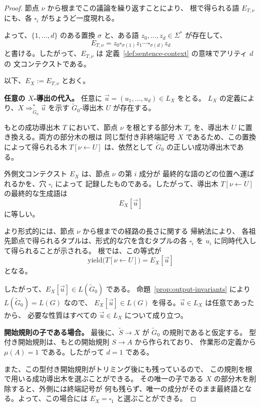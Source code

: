 \documentclass[11pt,a4paper]{ltjsarticle}
\theoremstyle{remark}
\newcommand{\tuple}[1]{\vec{#1}}
\newcommand{\blank}{\square}
\newcommand{\yield}{\mathrm{yield}}
\begin{document}
\begin{proof}
節点 \(\nu\) から根までこの議論を繰り返すことにより、
根で得られる語 \(E_{T,\nu}\) にも、各
\(\blank_i\) がちょうど一度現れる。

よって、\(\{1,\ldots,d\}\) のある置換 \(\sigma\) と、ある語
\(z_0,\ldots,z_d\in\Sigma^*\) が存在して、
\[
  E_{T,\nu}
  =
  z_0\blank_{\sigma(1)}z_1
  \cdots
  \blank_{\sigma(d)}z_d
\]
と書ける。したがって、\(E_{T,\nu}\) は
定義~\ref{def:sentence-context} の意味でアリティ \(d\) の
文コンテクストである。

以下、\(E_X:=E_{T,\nu}\) とおく。

\medskip
\noindent
\textbf{任意の \(X\)-導出の代入。}
任意に \(\tuple u=(u_1,\ldots,u_d)\in L_X\) をとる。
\(L_X\) の定義により、\(X\Rightarrow_{\widetilde G_0}^*\tuple u\) を示す
\(\widetilde G_0\)-導出木 \(U\) が存在する。

もとの成功導出木 \(T\) において、節点 \(\nu\) を根とする部分木
\(T_\nu\) を、導出木 \(U\) に置き換える。両方の部分木の根は
同じ型付き非終端記号 \(X\) であるため、この置換によって得られる木
\(T[\nu\leftarrow U]\) は、依然として \(\widetilde G_0\) の正しい成功導出木である。

外側文コンテクスト \(E_X\) は、節点 \(\nu\) の第 \(i\) 成分が
最終的な語のどの位置へ運ばれるかを、穴 \(\blank_i\) によって
記録したものである。したがって、導出木
\(T[\nu\leftarrow U]\) の最終的な生成語は
\[
  E_X[\tuple u]
\]
に等しい。

より形式的には、節点 \(\nu\) から根までの経路の長さに関する
帰納法により、
各祖先節点で得られるタプルは、形式的な穴を含むタプルの各
\(\blank_i\) を \(u_i\) に同時代入して得られることが示される。
根では、この等式が
\[
  \yield\bigl(T[\nu\leftarrow U]\bigr)
  =
  E_X[\tuple u]
\]
となる。

したがって、\(E_X[\tuple u]\in L(\widetilde G_0)\) である。
命題~\ref{prop:output-invariants} により \(L(\widetilde G_0)=L(G)\) なので、
\(E_X[\tuple u]\in L(G)\) を得る。\(\tuple u\in L_X\) は任意であったから、
必要な性質はすべての \(\tuple u\in L_X\) について成り立つ。

\medskip
\noindent
\textbf{開始規則の子である場合。}
最後に、\(\widetilde S\to X\) が \(\widetilde G_0\) の規則であると仮定する。
型付き開始規則は、もとの開始規則 \(S\to A\) から作られており、
作業形の定義から \(\mu(A)=1\) である。したがって \(d=1\) である。

また、この型付き開始規則がトリミング後にも残っているので、
この規則を根で用いる成功導出木を選ぶことができる。
その唯一の子である \(X\) の部分木を削除すると、外側には終端記号が
何も残らず、唯一の成分がそのまま最終語となる。よって、この場合には
\(E_X=\blank_1\) と選ぶことができる。
\end{proof}
\end{document}
